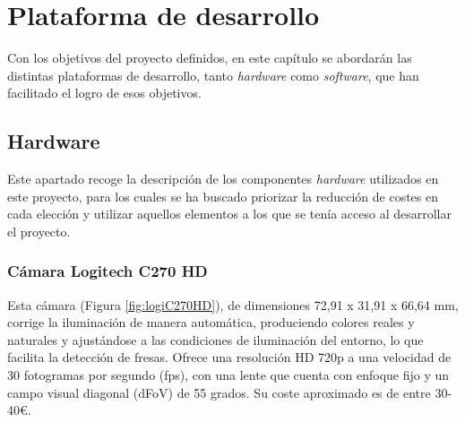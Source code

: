 \chapter{Plataforma de desarrollo}
\label{cap:capitulo4}
 
Con los objetivos del proyecto definidos, en este capítulo se abordarán las distintas plataformas de desarrollo, tanto \textit{hardware} como \textit{software}, que han facilitado el logro de esos objetivos.

\section{Hardware}
\label{sec:hardware}

Este apartado recoge la descripción de los componentes \textit{hardware} utilizados en este proyecto, para los cuales se ha buscado priorizar la reducción de costes en cada elección y utilizar aquellos elementos a los que se tenía acceso al desarrollar el proyecto.

\subsection{Cámara Logitech C270 HD}
\label{subsec:logiC270HD}

Esta cámara (Figura \ref{fig:logiC270HD}), de dimensiones 72,91 x 31,91 x 66,64 mm, corrige la iluminación de manera automática, produciendo colores reales y naturales y ajustándose a las condiciones de iluminación del entorno, lo que facilita la detección de fresas. Ofrece una resolución HD 720p %
a una velocidad de 30 fotogramas por segundo (fps), con una lente que cuenta con enfoque fijo y un campo visual diagonal (dFoV) de 55 grados. Su coste aproximado es de entre 30-40€.


